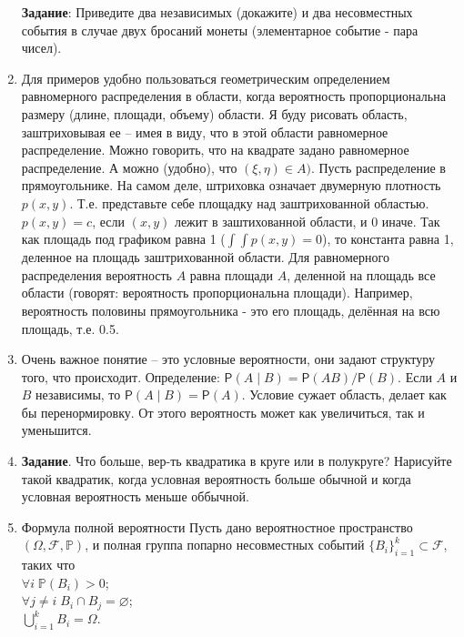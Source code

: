 \begin{enumerate}
\textbf{Задание}: Приведите два независимых (докажите) и два несовместных события в случае двух бросаний монеты (элементарное событие - пара чисел).
\item	Для примеров удобно пользоваться геометрическим определением равномерного распределения в области, когда вероятность пропорциональна размеру (длине, площади, объему) области. Я буду рисовать область, заштриховывая ее – имея в виду, что в этой области равномерное распределение. Можно говорить, что на квадрате задано равномерное распределение. А можно (удобно), что $(\xi,\eta) \in A)$. Пусть распределение в прямоугольнике.  На самом деле, штриховка означает  двумерную плотность $p(x,y)$. Т.е. представьте себе площадку над заштрихованной областью. $p(x,y) = c$, если $(x,y)$ лежит в заштихованной области, и 0 иначе. Так как площадь под графиком равна 1 ($\int \int p(x,y) = 0$), то константа равна 1, деленное на площадь заштрихованной области. Для равномерного распределения вероятность $A$ равна площади $A$, деленной на площадь все области (говорят: вероятность пропорциональна площади). Например, вероятность половины прямоугольника - это его площадь, делённая на всю площадь, т.е. 0.5.
\item	Очень важное понятие – это условные вероятности, они задают структуру того, что происходит.
Определение: $\textsf{P}(A\mid B) = \textsf{P}(AB)/ \textsf{P}(B)$. Если $A$ и $B$ независимы, то $\textsf{P}(A\mid B) = \textsf{P}(A)$. Условие сужает область, делает как бы перенормировку. От этого вероятность может как увеличиться, так и уменьшится.
\item 
 \textbf{Задание}. Что больше, вер-ть квадратика в круге или в полукруге? Нарисуйте такой квадратик, когда условная вероятность больше обычной и когда условная вероятность меньше оббычной.
\item	Формула полной вероятности Пусть дано вероятностное пространство $(\Omega,\mathcal{F},\mathbb{P})$, и полная группа попарно несовместных событий $\{B_i\}_{i=1}^{k} \subset \mathcal{F}$, таких что\\
$\forall i \; \mathbb{P} (B_i) > 0$;\\
$\forall{j \ne i} \; B_i \cap B_j = \varnothing$;\\
$\bigcup_{i=1}^k B_i=\Omega.$


\end{enumerate}
